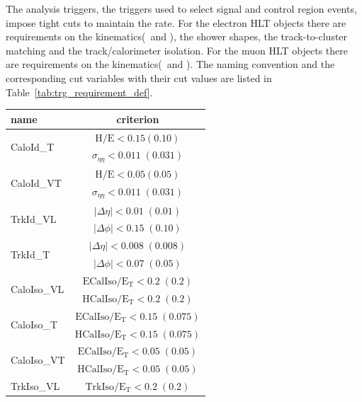 The analysis triggers, the triggers used to select signal and control region events, 
impose tight cuts to maintain the rate. 
For the electron HLT objects there are requirements on
the kinematics(\pt\ and \Eta), 
the shower shapes, %
the track-to-cluster matching and 
the track/calorimeter isolation. %
For the muon HLT objects there are requirements on 
the kinematics(\pt\ and \Eta). 
The naming convention and the corresponding 
cut variables with their cut values are listed in Table~\ref{tab:trg_requirement_def}.
%
\begin{table}[!ht]
 \centering
 \begin{tabular}{l|c}
   \hline
   name                       &  criterion \\
   \hline \hline
   \multirow{2}{*}{CaloId\_T} & $\mathrm{H/E < 0.15 (0.10) }$ \\
                               & $\sigma_{\eta\eta}\mathrm{< 0.011\;(0.031)}$ \\
    \hline
   \multirow{2}{*}{CaloId\_VT} & $\mathrm{H/E < 0.05 (0.05) }$ \\
                               & $\sigma_{\eta\eta}\mathrm{< 0.011\;(0.031)}$  \\
    \hline \hline
    \multirow{2}{*}{TrkId\_VL} & $|\Delta\eta|\mathrm{< 0.01\; (0.01)}$ \\
                               & $|\Delta\phi|\mathrm{< 0.15\;(0.10)}$  \\
    \hline
    \multirow{2}{*}{TrkId\_T} & $|\Delta\eta|\mathrm{< 0.008\; (0.008)}$ \\
                              & $|\Delta\phi|\mathrm{< 0.07\;(0.05)}$ \\
    \hline \hline
    \multirow{2}{*}{CaloIso\_VL} & $\mathrm{ECalIso/E_T <0.2\;(0.2)}$ \\
                                 & $\mathrm{HCalIso/E_T <0.2\;(0.2)}$ \\
    \hline
    \multirow{2}{*}{CaloIso\_T} & $\mathrm{ECalIso/E_T <0.15\;(0.075)}$ \\
                                 & $\mathrm{HCalIso/E_T <0.15\;(0.075)}$ \\
    \hline
    \multirow{2}{*}{CaloIso\_VT} & $\mathrm{ECalIso/E_T <0.05\;(0.05)}$ \\
                                 & $\mathrm{HCalIso/E_T <0.05\;(0.05)}$ \\
    \hline \hline
    TrkIso\_VL                   & $\mathrm{TrkIso/E_T <0.2\;(0.2)}$ \\

\end{tabular}
\end{table}

